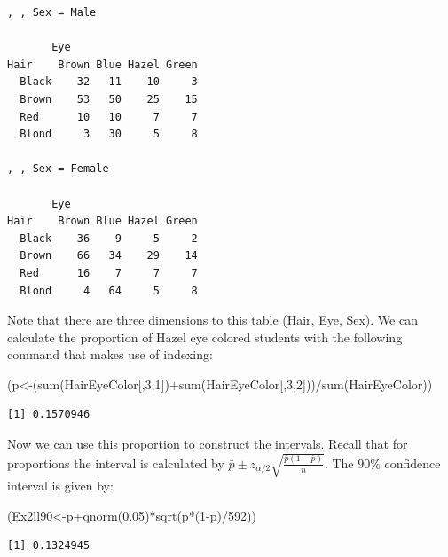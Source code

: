\documentclass[
  letterpaper,
  DIV=11,
  numbers=noendperiod]{scrreprt}
\newenvironment{Shaded}{\begin{snugshade}}{\end{snugshade}}
\newcommand{\DecValTok}[1]{\textcolor[rgb]{0.68,0.00,0.00}{#1}}
\newcommand{\FloatTok}[1]{\textcolor[rgb]{0.68,0.00,0.00}{#1}}
\newcommand{\FunctionTok}[1]{\textcolor[rgb]{0.28,0.35,0.67}{#1}}
\newcommand{\NormalTok}[1]{\textcolor[rgb]{0.00,0.23,0.31}{#1}}
\newcommand{\OtherTok}[1]{\textcolor[rgb]{0.00,0.23,0.31}{#1}}
\newcommand{\SpecialCharTok}[1]{\textcolor[rgb]{0.37,0.37,0.37}{#1}}
\begin{document}
\begin{verbatim}
, , Sex = Male

       Eye
Hair    Brown Blue Hazel Green
  Black    32   11    10     3
  Brown    53   50    25    15
  Red      10   10     7     7
  Blond     3   30     5     8

, , Sex = Female

       Eye
Hair    Brown Blue Hazel Green
  Black    36    9     5     2
  Brown    66   34    29    14
  Red      16    7     7     7
  Blond     4   64     5     8
\end{verbatim}

Note that there are three dimensions to this table (Hair, Eye, Sex). We
can calculate the proportion of Hazel eye colored students with the
following command that makes use of indexing:

\begin{Shaded}
\begin{Highlighting}[numbers=left,,]
\NormalTok{(p}\OtherTok{\textless{}{-}}\NormalTok{(}\FunctionTok{sum}\NormalTok{(HairEyeColor[,}\DecValTok{3}\NormalTok{,}\DecValTok{1}\NormalTok{])}\SpecialCharTok{+}\FunctionTok{sum}\NormalTok{(HairEyeColor[,}\DecValTok{3}\NormalTok{,}\DecValTok{2}\NormalTok{]))}\SpecialCharTok{/}\FunctionTok{sum}\NormalTok{(HairEyeColor))}
\end{Highlighting}
\end{Shaded}

\begin{verbatim}
[1] 0.1570946
\end{verbatim}

Now we can use this proportion to construct the intervals. Recall that
for proportions the interval is calculated by
\(\bar{p} \pm z_{\alpha/2} \sqrt{\frac{\bar{p}(1-\bar{p})}{n}}\). The
\(90\)\% confidence interval is given by:

\begin{Shaded}
\begin{Highlighting}[numbers=left,,]
\NormalTok{(Ex2ll90}\OtherTok{\textless{}{-}}\NormalTok{p}\SpecialCharTok{+}\FunctionTok{qnorm}\NormalTok{(}\FloatTok{0.05}\NormalTok{)}\SpecialCharTok{*}\FunctionTok{sqrt}\NormalTok{(p}\SpecialCharTok{*}\NormalTok{(}\DecValTok{1}\SpecialCharTok{{-}}\NormalTok{p)}\SpecialCharTok{/}\DecValTok{592}\NormalTok{))}
\end{Highlighting}
\end{Shaded}

\begin{verbatim}
[1] 0.1324945
\end{verbatim}
\end{document}
